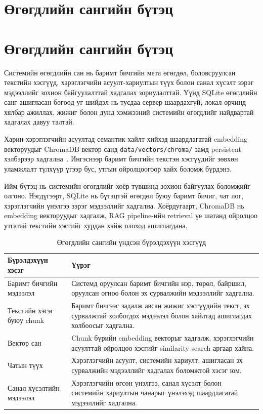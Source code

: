 \section{Өгөгдлийн сангийн бүтэц}

\section{Өгөгдлийн сангийн бүтэц}

Системийн өгөгдлийн сан нь баримт бичгийн мета өгөгдөл, боловсруулсан текстийн хэсгүүд, хэрэглэгчийн асуулт-хариултын түүх болон санал хүсэлт зэрэг мэдээллийг зохион байгуулалттай хадгалах зориулалттай. Үүнд SQLite өгөгдлийн санг ашигласан бөгөөд уг шийдэл нь тусдаа сервер шаардахгүй, локал орчинд хялбар ажиллах, жижиг болон дунд хэмжээний системийн өгөгдлийг найдвартай хадгалах давуу талтай.

Харин хэрэглэгчийн асуултад семантик хайлт хийхэд шаардлагатай embedding векторуудыг ChromaDB вектор санд \texttt{data/vectors/chroma/} замд persistent хэлбэрээр хадгална~\cite{chromadb}. Ингэснээр баримт бичгийн текстэн хэсгүүдийг зөвхөн уламжлалт түлхүүр үгээр бус, утгын ойролцоогоор хайх боломж бүрдэнэ.

Ийм бүтэц нь системийн өгөгдлийг хоёр түвшинд зохион байгуулах боломжийг олгоно. Нэгдүгээрт, SQLite нь бүтэцтэй өгөгдөл буюу баримт бичиг, чат лог, хэрэглэгчийн үнэлгээ зэрэг мэдээллийг хадгална. Хоёрдугаарт, ChromaDB нь embedding векторуудыг хадгалж, RAG pipeline-ийн retrieval үе шатанд ойролцоо утгатай текстийн хэсгийг хурдан хайж олоход ашиглагдана.

\begin{table}[H]
\centering
\begin{tabular}{|p{3.0cm}|p{10.3cm}|}
\hline
\textbf{Бүрэлдэхүүн хэсэг} & \textbf{Үүрэг} \\ \hline
Баримт бичгийн мэдээлэл & Системд оруулсан баримт бичгийн нэр, төрөл, байршил, оруулсан огноо болон эх сурвалжийн мэдээллийг хадгална. \\ \hline
Текстийн хэсэг буюу chunk & Баримт бичгээс задалж авсан жижиг хэсгүүдийн текст, эх сурвалжтай холбогдох мэдээлэл болон хайлтад ашиглагдах холбоосыг хадгална. \\ \hline
Вектор сан & Chunk бүрийн embedding векторыг хадгалж, хэрэглэгчийн асуулттай ойролцоо хэсгийг similarity search аргаар хайна. \\ \hline
Чатын түүх & Хэрэглэгчийн асуулт, системийн хариулт, ашигласан эх сурвалжийн мэдээллийг хадгалах боломжтой хэсэг юм.
\\ \hline
Санал хүсэлтийн мэдээлэл &
Хэрэглэгчийн өгсөн үнэлгээ, санал хүсэлт болон системийн хариултын чанарыг үнэлэхэд шаардлагатай мэдээллийг хадгална. \\ \hline
\end{tabular}
\caption[Өгөгдлийн сангийн бүрэлдэхүүн хэсгүүд]{Өгөгдлийн сангийн үндсэн бүрэлдэхүүн хэсгүүд}
\label{tab:database-structure}
\end{table}


